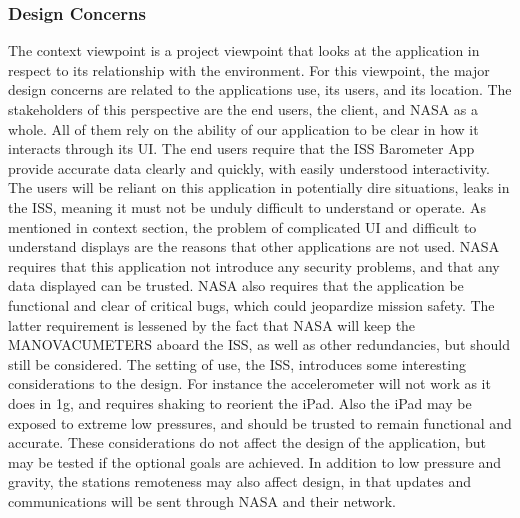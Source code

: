 \documentclass[onecolumn, draftclsnofoot,10pt, compsoc]{IEEEtran}
\def \CapstoneProjectName{ISS Barometer App }
\begin{document}
\subsubsection{Design Concerns}
The context viewpoint is a project viewpoint that looks at the application in respect to its relationship with the environment.
For this viewpoint, the major design concerns are related to the applications use, its users, and its location.
The stakeholders of this perspective are the end users, the client, and NASA as a whole.
All of them rely on the ability of our application to be clear in how it interacts through its UI.
The end users require that the \CapstoneProjectName provide accurate data clearly and quickly, with easily understood interactivity.
The users will be reliant on this application in potentially dire situations, leaks in the ISS, meaning it must not be unduly difficult to understand or operate.
As mentioned in context section, the problem of complicated UI and difficult to understand displays are the reasons that other applications are not used.
NASA requires that this application not introduce any security problems, and that any data displayed can be trusted.
NASA also requires that the application be functional and clear of critical bugs, which could jeopardize mission safety.
The latter requirement is lessened by the fact that NASA will keep the MANOVACUMETERS aboard the ISS, as well as other redundancies, but should still be considered.
The setting of use, the ISS, introduces some interesting considerations to the design.
For instance the accelerometer will not work as it does in 1g, and requires shaking to reorient the iPad.
Also the iPad may be exposed to extreme low pressures, and should be trusted to remain functional and accurate.
These considerations do not affect the design of the application, but may be tested if the optional goals are achieved.
In addition to low pressure and gravity, the stations remoteness may also affect design, in that updates and communications will be sent through NASA and their network.
\end{document}

